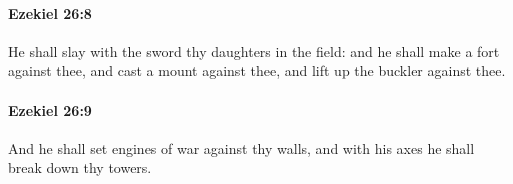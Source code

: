 		\paragraph{Ezekiel 26:8} %
			\label{EZEKIEL-26-8}

			He shall slay with the sword thy daughters in the field: and he shall make a fort against thee, and cast a mount against thee, and lift up the buckler against thee.


		\paragraph{Ezekiel 26:9} %
			\label{EZEKIEL-26-9}

			And he shall set engines of war against thy walls, and with his axes he shall break down thy towers.


